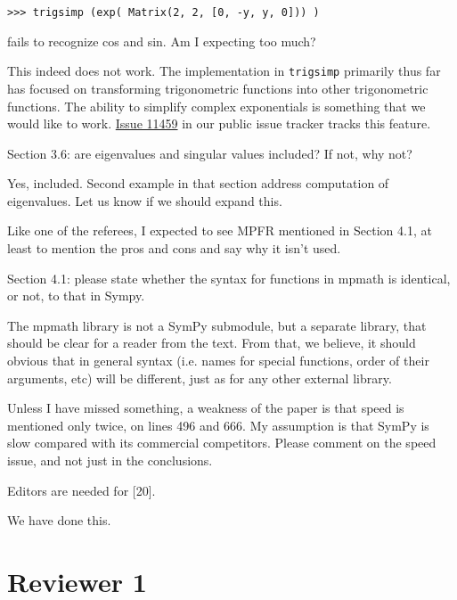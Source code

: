 \documentclass[answers,12pt]{exam}
\begin{document}
\begin{questions}
\begin{verbatim}
>>> trigsimp (exp( Matrix(2, 2, [0, -y, y, 0])) )
\end{verbatim}
fails to recognize cos and
sin. Am I expecting too much?
\begin{solution}
  This indeed does not work. The implementation in \verb|trigsimp| primarily
  thus far has focused on transforming trigonometric functions into other
  trigonometric functions. The ability to simplify complex exponentials is
  something that we would like to work.
  \href{https://github.com/sympy/sympy/issues/11459}{Issue 11459} in our
  public issue tracker tracks this feature.
\end{solution}
\question Section 3.6: are eigenvalues and singular
values included? If not, why not?
\begin{solution}
Yes, included.  Second example in that section address computation of
eigenvalues.  Let us know if we should expand this.
\end{solution}
\question Like one of the referees, I expected to
see MPFR mentioned in Section 4.1, at least to mention the pros and cons and
say why it isn't used.
\begin{solution}
\end{solution}
\question Section 4.1: please state whether the syntax for
functions in mpmath is identical, or not, to that in Sympy.
\begin{solution}
The mpmath library is not a SymPy submodule, but a separate library,
that should be clear for a reader from the text.  From that, we believe,
it should obvious that in general syntax (i.e. names for special
functions, order of their arguments, etc) will be different, just
as for any other external library.
\end{solution}
\question Unless I have
missed something, a weakness of the paper is that speed is mentioned only
twice, on lines 496 and 666. My assumption is that SymPy is slow compared with
its commercial competitors. Please comment on the speed issue, and not just in
the conclusions.
\begin{solution}
\end{solution}
\question Editors are needed for [20].
\begin{solution}
We have done this.
\end{solution}
\end{questions}

\section{Reviewer 1}
\end{document}
